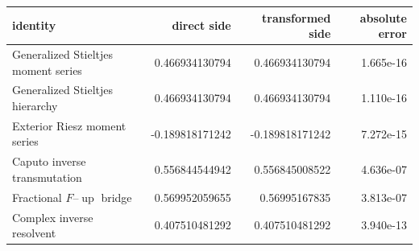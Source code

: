 \begin{tabular}{@{}lrrr@{}}
\toprule
identity & direct side & transformed side & absolute error\\
\midrule
Generalized Stieltjes moment series & 0.466934130794 & 0.466934130794 & 1.665e-16\\
Generalized Stieltjes hierarchy & 0.466934130794 & 0.466934130794 & 1.110e-16\\
Exterior Riesz moment series & -0.189818171242 & -0.189818171242 & 7.272e-15\\
Caputo inverse transmutation & 0.556844544942 & 0.556845008522 & 4.636e-07\\
Fractional $F$--$\operatorname{up}$ bridge & 0.569952059655 & 0.56995167835 & 3.813e-07\\
Complex inverse resolvent & 0.407510481292 & 0.407510481292 & 3.940e-13\\
\bottomrule
\end{tabular}
